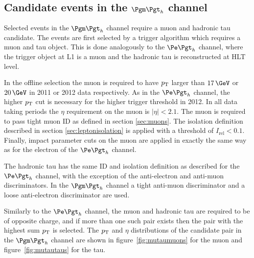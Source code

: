 \subsection{Candidate events in the $\mutau$ channel}

Selected events in the $\mutau$ channel require a muon and hadronic tau
candidate. The events are first selected by a trigger algorithm which requires
a muon and tau object. This is done analogously to the $\etau$ channel,
where the trigger object at \ac{L1} is a muon and the hadronic tau is
reconstructed at \ac{HLT} level.

In the offline selection the muon is required to have $p_{\mathrm{T}}$ larger than
$17\,\GeV$ or $20\,\GeV$ in 2011 or 2012 data respectively. 
As in the $\etau$ channel, the higher $p_{\mathrm{T}}$ cut is necessary for the
higher trigger threshold in 2012. In all data taking periods the $\eta$ requirement
on the muon is $|\eta| < 2.1$. The muon is required to pass tight muon ID as
defined in section \ref{sec:muons}. The isolation definition described in 
section \ref{sec:leptonisolation} is
applied with a threshold of $I_{\text{rel}} < 0.1$. Finally, impact parameter cuts on the muon are
applied in exactly the same way as for the electron of the $\etau$ channel.

The hadronic tau has the same ID and isolation definition as described for the $\etau$
channel, with the exception of the anti-electron and anti-muon discriminators.
In the $\mutau$ channel a tight anti-muon discriminator and a loose
anti-electron discriminator are used. 

Similarly to the $\etau$ channel, the muon and hadronic tau are required to be of 
opposite charge, and if more than one such pair exists then the pair with the highest sum $p_{\mathrm{T}}$
is selected. The $p_{\mathrm{T}}$ and $\eta$ distributions of the candidate pair in the
$\mutau$ channel are shown in figure~\ref{fig:mutaumuons} for the muon and
figure~\ref{fig:mutautaus} for the tau. 


